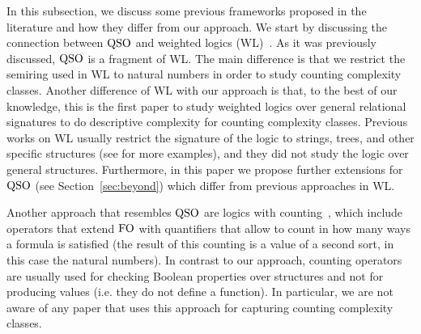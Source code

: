 In this subsection, we discuss some previous frameworks proposed in the literature and how they differ from our approach.
We start by discussing the connection between ${\rm QSO}$ and weighted logics (WL)~\cite{DrosteG07}. 
As it was previously discussed, ${\rm QSO}$ is a fragment of WL.
The main difference is that we restrict the semiring used in WL to natural numbers in order to study counting complexity classes.
Another difference of WL with our approach is that, to the best of our knowledge, this is the first paper to study weighted logics over general relational signatures to do descriptive complexity for counting complexity classes. 
Previous works on WL usually restrict the signature of the logic to strings, trees, and other specific structures (see \cite{droste2009handbook} for more examples), and they did not study the logic over general structures. 
Furthermore, in this paper we propose further extensions for ${\rm QSO}$ (see Section~\ref{sec:beyond}) which differ from previous approaches in WL.

Another approach that resembles ${\rm QSO}$ are logics with counting~\cite{IL90,E97,GG98,L04}, which include operators that extend ${\rm FO}$ with quantifiers that allow to count in how many ways a formula  is satisfied (the result of this counting is a value of a second sort, in this case the  natural numbers). 
In contrast to our approach, counting operators are usually used for checking Boolean properties over structures and not for producing values (i.e. they do not define a function).
In particular, we are not aware of any paper that uses this approach for capturing counting complexity classes.



